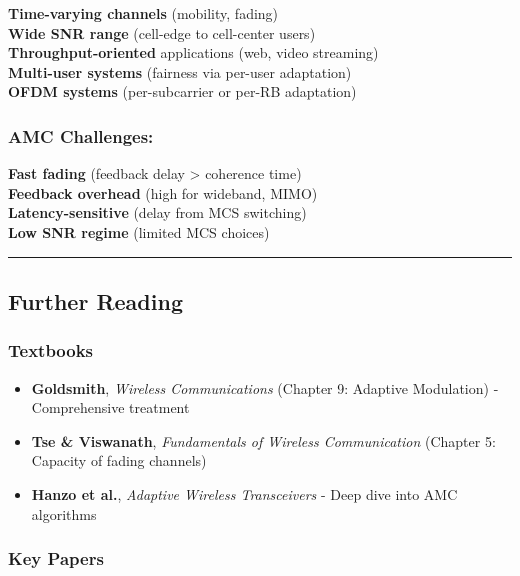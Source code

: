 \textbf{Time-varying channels} (mobility, fading)\\
\textbf{Wide SNR range} (cell-edge to cell-center users)\\
\textbf{Throughput-oriented} applications (web, video streaming)\\
\textbf{Multi-user systems} (fairness via per-user adaptation)\\
\textbf{OFDM systems} (per-subcarrier or per-RB adaptation)

\subsubsection{AMC Challenges:}\label{amc-challenges}

\textbf{Fast fading} (feedback delay \textgreater{} coherence time)\\
\textbf{Feedback overhead} (high for wideband, MIMO)\\
\textbf{Latency-sensitive} (delay from MCS switching)\\
\textbf{Low SNR regime} (limited MCS choices)

\begin{center}\rule{0.5\linewidth}{0.5pt}\end{center}

\subsection{Further Reading}\label{further-reading}

\subsubsection{Textbooks}\label{textbooks}

\begin{itemize}
\tightlist
\item
  \textbf{Goldsmith}, \emph{Wireless Communications} (Chapter 9:
  Adaptive Modulation) - Comprehensive treatment
\item
  \textbf{Tse \& Viswanath}, \emph{Fundamentals of Wireless
  Communication} (Chapter 5: Capacity of fading channels)
\item
  \textbf{Hanzo et al.}, \emph{Adaptive Wireless Transceivers} - Deep
  dive into AMC algorithms
\end{itemize}

\subsubsection{Key Papers}\label{key-papers}

